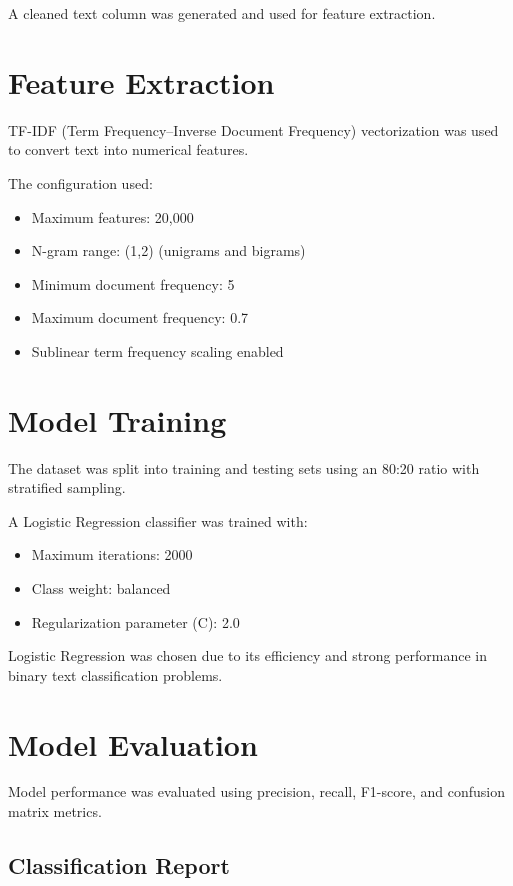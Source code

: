 \documentclass[12pt]{article}
\begin{document}
A cleaned text column was generated and used for feature extraction.

\section{Feature Extraction}

TF-IDF (Term Frequency–Inverse Document Frequency) vectorization was used
to convert text into numerical features.

The configuration used:

\begin{itemize}
\item Maximum features: 20,000
\item N-gram range: (1,2) (unigrams and bigrams)
\item Minimum document frequency: 5
\item Maximum document frequency: 0.7
\item Sublinear term frequency scaling enabled
\end{itemize}

\section{Model Training}

The dataset was split into training and testing sets using an
80:20 ratio with stratified sampling.

A Logistic Regression classifier was trained with:

\begin{itemize}
\item Maximum iterations: 2000
\item Class weight: balanced
\item Regularization parameter (C): 2.0
\end{itemize}

Logistic Regression was chosen due to its efficiency and strong
performance in binary text classification problems.

\section{Model Evaluation}

Model performance was evaluated using precision, recall,
F1-score, and confusion matrix metrics.

\subsection{Classification Report}
\end{document}
